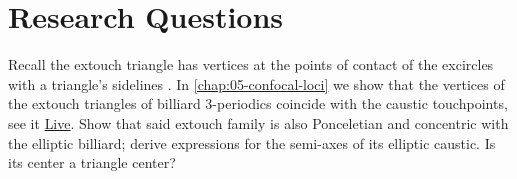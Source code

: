 \section{Research Questions}

\begin{question}
Recall the extouch triangle has vertices at the points of contact of the excircles with a triangle's sidelines \cite[Extouch triangle]{mw}. 
In \cref{chap:05-confocal-loci} we show that the vertices of the extouch triangles of billiard 3-periodics coincide with the caustic touchpoints, see it 
\href{https://bit.ly/33PufRv}{Live}. Show that said extouch family is also Ponceletian and concentric with the elliptic billiard; derive expressions for the semi-axes of its elliptic caustic. Is its center a triangle center? 
\label{que:02-extouch}
\end{question}

